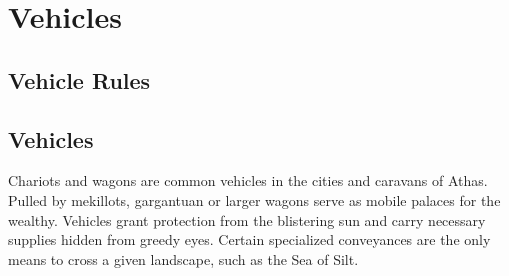 \chapter{Vehicles}\label{chap:vehicles}

\section{Vehicle Rules}

\section{Vehicles}

Chariots and wagons are common vehicles in the
cities and caravans of Athas. Pulled by mekillots,
gargantuan or larger wagons serve as mobile
palaces for the wealthy. Vehicles grant protection
from the blistering sun and carry necessary
supplies hidden from greedy eyes. Certain
specialized conveyances are the only means to
cross a given landscape, such as the Sea of Silt.

